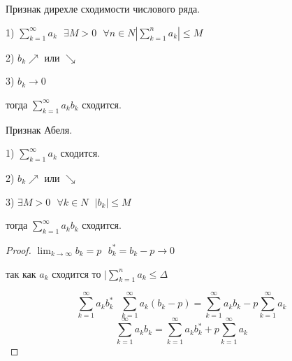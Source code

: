 \begin{title}[\Large]
  Признак дирехле сходимости  числового ряда.
\end{title}

\begin{theorem}
  1) $\sum_{k=1}^{\infty} a_k ~~~ \exists M > 0 ~~~ \forall n \in N
  |\sum_{k=1}^n a_k| \le M$

  2) $b_k \nearrow$ или $\searrow$

  3) $b_k \to 0$

  тогда $\sum_{k=1}^{\infty} a_k b_k$ сходится.
\end{theorem}

\begin{title}[\Large]
  Признак Абеля.
\end{title}

\begin{theorem}
  1) $\sum_{k=1}^{\infty} a_k$ сходится.

  2) $b_k \nearrow$ или $\searrow$

  3) $\exists M > 0 ~~~ \forall k \in N ~~~ |b_k| \le M$

  тогда $\sum_{k=1}^{\infty} a_k b_k$ сходится.
\end{theorem}

\begin{proof}
  $\lim_{k \to \infty} b_k = p ~~~ b_k^* = b_k - p \to 0$

  так как $a_k$ сходится то $| \sum_{k=1}^n a_k \le \Delta$

  $$
  \sum_{k=1}^{\infty} a_k b_k^*  ~~~ \sum_{k=1}^{\infty} a_k (b_k - p) =
  \sum_{k=1}^{\infty} a_k b_k - p \sum_{k=1}^{\infty} a_k
  $$
  $$
  \sum_{k=1}^{\infty} a_k b_k = \sum_{k=1}^{\infty} a_k b_k^* +
  p\sum_{k=1}^{\infty} a_k
  $$
\end{proof}